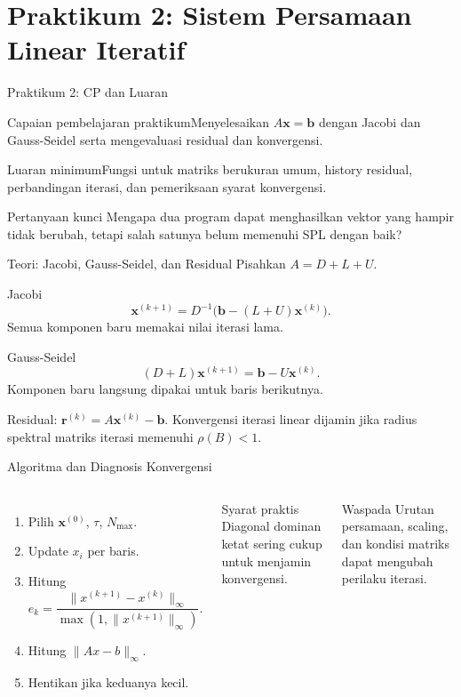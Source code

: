 \documentclass[slides,english,noindex,lean,nobackpage,nocopyright,noupdate,nosummary]{enacom}
\newcommand{\CPBox}[1]{\begin{block}{Capaian pembelajaran praktikum}#1\end{block}}
\newcommand{\OutBox}[1]{\begin{exampleblock}{Luaran minimum}#1\end{exampleblock}}
\begin{document}
\section{Praktikum 2: Sistem Persamaan Linear Iteratif}

\begin{frame}{Praktikum 2: CP dan Luaran}
\CPBox{Menyelesaikan $A\mathbf{x}=\mathbf{b}$ dengan Jacobi dan Gauss-Seidel serta mengevaluasi residual dan konvergensi.}
\OutBox{Fungsi untuk matriks berukuran umum, history residual, perbandingan iterasi, dan pemeriksaan syarat konvergensi.}
\begin{block}{Pertanyaan kunci}
Mengapa dua program dapat menghasilkan vektor yang hampir tidak berubah, tetapi salah satunya belum memenuhi SPL dengan baik?
\end{block}
\end{frame}

\begin{frame}{Teori: Jacobi, Gauss-Seidel, dan Residual}
Pisahkan $A=D+L+U$.
\begin{block}{Jacobi}
\[
\mathbf{x}^{(k+1)}=D^{-1}\bigl(\mathbf{b}-(L+U)\mathbf{x}^{(k)}\bigr).
\]
Semua komponen baru memakai nilai iterasi lama.
\end{block}
\begin{block}{Gauss-Seidel}
\[
(D+L)\mathbf{x}^{(k+1)}=\mathbf{b}-U\mathbf{x}^{(k)}.
\]
Komponen baru langsung dipakai untuk baris berikutnya.
\end{block}
Residual: $\mathbf{r}^{(k)}=A\mathbf{x}^{(k)}-\mathbf{b}$. Konvergensi iterasi linear dijamin jika radius spektral matriks iterasi memenuhi $\rho(B)<1$.
\end{frame}

\begin{frame}{Algoritma dan Diagnosis Konvergensi}
\begin{columns}[T]
\begin{enumerate}
\item Pilih $\mathbf{x}^{(0)}$, $\tau$, $N_{\max}$.
\item Update $x_i$ per baris.
\item Hitung
\[
e_k=\frac{\|x^{(k+1)}-x^{(k)}\|_\infty}{\max(1,\|x^{(k+1)}\|_\infty)}.
\]
\item Hitung $\|A x-b\|_\infty$.
\item Hentikan jika keduanya kecil.
\end{enumerate}
\begin{block}{Syarat praktis}
Diagonal dominan ketat sering cukup untuk menjamin konvergensi.
\end{block}
\begin{alertblock}{Waspada}
Urutan persamaan, scaling, dan kondisi matriks dapat mengubah perilaku iterasi.
\end{alertblock}
\end{columns}
\end{frame}
\end{document}

